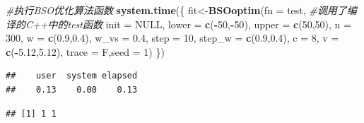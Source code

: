 \documentclass[]{ctexbook}
\newenvironment{Shaded}{\begin{snugshade}}{\end{snugshade}}
\newcommand{\KeywordTok}[1]{\textcolor[rgb]{0.13,0.29,0.53}{\textbf{#1}}}
\newcommand{\DataTypeTok}[1]{\textcolor[rgb]{0.13,0.29,0.53}{#1}}
\newcommand{\DecValTok}[1]{\textcolor[rgb]{0.00,0.00,0.81}{#1}}
\newcommand{\FloatTok}[1]{\textcolor[rgb]{0.00,0.00,0.81}{#1}}
\newcommand{\CommentTok}[1]{\textcolor[rgb]{0.56,0.35,0.01}{\textit{#1}}}
\newcommand{\OtherTok}[1]{\textcolor[rgb]{0.56,0.35,0.01}{#1}}
\newcommand{\OperatorTok}[1]{\textcolor[rgb]{0.81,0.36,0.00}{\textbf{#1}}}
\newcommand{\NormalTok}[1]{#1}
\begin{document}
\begin{Shaded}
\begin{Highlighting}[]
\CommentTok{#执行BSO优化算法函数}
\KeywordTok{system.time}\NormalTok{(\{}
\NormalTok{  fit<-}\KeywordTok{BSOoptim}\NormalTok{(}\DataTypeTok{fn =}\NormalTok{ test, }\CommentTok{#调用了编译的C++中的test函数}
                \DataTypeTok{init =} \OtherTok{NULL}\NormalTok{,}
                \DataTypeTok{lower =} \KeywordTok{c}\NormalTok{(}\OperatorTok{-}\DecValTok{50}\NormalTok{,}\OperatorTok{-}\DecValTok{50}\NormalTok{),}
                \DataTypeTok{upper =} \KeywordTok{c}\NormalTok{(}\DecValTok{50}\NormalTok{,}\DecValTok{50}\NormalTok{),}
                \DataTypeTok{n =} \DecValTok{300}\NormalTok{,}
                \DataTypeTok{w =} \KeywordTok{c}\NormalTok{(}\FloatTok{0.9}\NormalTok{,}\FloatTok{0.4}\NormalTok{),}
                \DataTypeTok{w_vs =} \FloatTok{0.4}\NormalTok{, }
                \DataTypeTok{step =} \DecValTok{10}\NormalTok{,}
                \DataTypeTok{step_w =} \KeywordTok{c}\NormalTok{(}\FloatTok{0.9}\NormalTok{,}\FloatTok{0.4}\NormalTok{),}
                \DataTypeTok{c =} \DecValTok{8}\NormalTok{,}
                \DataTypeTok{v =} \KeywordTok{c}\NormalTok{(}\OperatorTok{-}\FloatTok{5.12}\NormalTok{,}\FloatTok{5.12}\NormalTok{),}
                \DataTypeTok{trace =}\NormalTok{ F,}\DataTypeTok{seed =} \DecValTok{1}\NormalTok{)}
\NormalTok{\})}
\end{Highlighting}
\end{Shaded}

\begin{verbatim}
##    user  system elapsed 
##    0.13    0.00    0.13
\end{verbatim}

\begin{Shaded}
\end{Shaded}

\begin{verbatim}
## [1] 1 1
\end{verbatim}

\begin{Shaded}
\end{Shaded}
\end{document}
